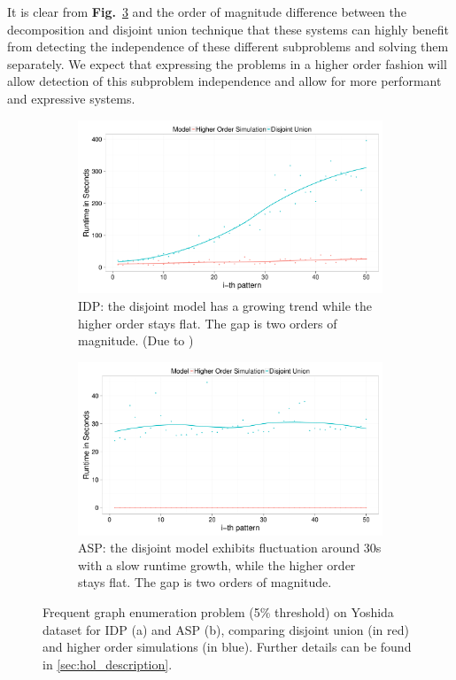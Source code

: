 It is clear from \textbf{Fig.}~\ref{fig:decomposition_fol} and the order of magnitude difference between the decomposition and disjoint union technique that these systems can highly benefit from detecting the independence of these different subproblems and solving them separately.
We expect that expressing the problems in a higher order fashion will allow detection of this subproblem independence and allow for more performant and expressive systems.
\begin{figure}[thb]
\centering
\begin{subfigure}{.44\textwidth}
  \centering
\includegraphics[scale=0.14]{extra/figure_comparison_yoshida.pdf}
\caption{\footnotesize{IDP: the disjoint model has a growing trend while the higher order stays flat. The gap is two orders of magnitude. (Due to \cite{ilp_graph_mining})}}
  \label{fig:decomposition_idp}
\end{subfigure}%
\hfill
\begin{subfigure}{0.46\textwidth}
  \centering
 \includegraphics[scale=0.14]{extra/asp_fol_vs_decomposed_yoshida.pdf}
 \caption{\footnotesize{ASP: the disjoint model exhibits fluctuation around 30s with a slow runtime growth, while the higher order stays flat. The gap is two orders of magnitude.}}
  \label{fig:decomposition_asp}
\end{subfigure}
\caption{\footnotesize{Frequent graph enumeration problem (5\% threshold) on Yoshida dataset for IDP (a) and ASP (b), comparing disjoint union (in red) and higher order simulations (in blue). Further details can be found in \ref{sec:hol_description}.}}
\label{fig:decomposition_fol}
\end{figure}

